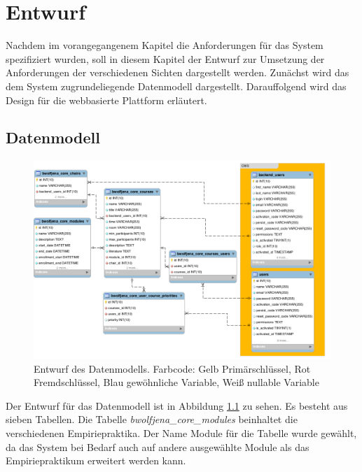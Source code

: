 
\chapter{Entwurf}
\label{chapter:design}
    Nachdem im vorangegangenem Kapitel die Anforderungen für das System spezifiziert wurden, soll in diesem Kapitel der Entwurf zur Umsetzung der Anforderungen der verschiedenen Sichten dargestellt werden.
    Zunächst wird das dem System zugrundeliegende Datenmodell dargestellt.
    Darauffolgend wird das Design für die webbasierte Plattform erläutert.     
    
    \section{Datenmodell}
        \begin{figure}
            \centering
            \includegraphics[width=1.0\textwidth]{./design/images/data-model.png}\par\vspace{1cm}
            \caption{Entwurf des Datenmodells. Farbcode: Gelb Primärschlüssel, Rot Fremdschlüssel, Blau gewöhnliche Variable, Weiß nullable Variable}
            \label{fig:datamodel}
        \end{figure}
    
        Der Entwurf für das Datenmodell ist in Abbildung \ref{fig:datamodel} zu sehen.
        Es besteht aus sieben Tabellen.
        Die Tabelle \textit{bwolfjena\_core\_modules} beinhaltet die verschiedenen Empiriepraktika.
        Der Name Module für die Tabelle wurde gewählt, da das System bei Bedarf auch auf andere ausgewählte Module als das Empiriepraktikum erweitert werden kann.
        

